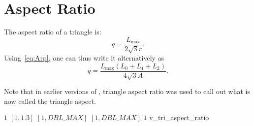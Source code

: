 \section{Aspect Ratio\label{s:tri-aspect-ratio}}

The aspect ratio of a triangle is: 
\[
q = \frac{L_{\max}}{2\sqrt{3}r}.
\]
Using~\eqref{eq:Arp}, one can thus write it alternatively as
\begin{equation*}
\label{eq:triangle_aspect_ratio}
q = \frac{L_{\max}(L_0 + L_1 + L_2)}{4\sqrt{3}A}.
\end{equation*}

Note that in earlier versions of \verd{}, triangle aspect ratio
was used to call out what is now called the triangle aspect.

%
{$1$}%
{$[1,1.3]$}%
{$[1,DBL\_MAX]$}%
{$[1,DBL\_MAX]$}%
{$1$}%
{\cite{pebay:03}}%
{v\_tri\_aspect\_ratio}%

